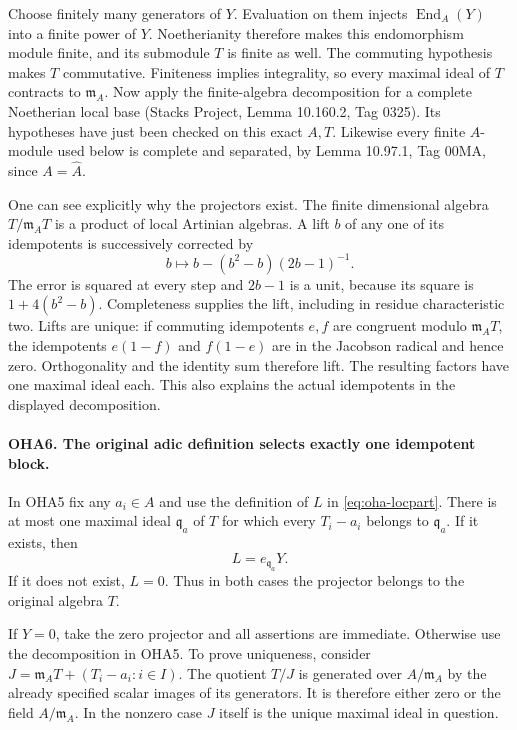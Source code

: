 Choose finitely many generators of \(Y\). Evaluation on them
injects \(\operatorname{End}_A(Y)\) into a finite power of \(Y\).
Noetherianity therefore makes this endomorphism module finite,
and its submodule \(T\) is finite as well. The commuting hypothesis
makes \(T\) commutative. Finiteness implies integrality, so every
maximal ideal of \(T\) contracts to \(\mathfrak m_A\).
Now apply the finite-algebra decomposition for a complete
Noetherian local base (Stacks Project, Lemma 10.160.2, Tag 0325).
Its hypotheses have just been checked on this exact \(A,T\).
Likewise every finite \(A\)-module used below is complete and
separated, by Lemma 10.97.1, Tag 00MA, since \(A=\widehat A\).

One can see explicitly why the projectors exist. The finite
dimensional algebra \(T/\mathfrak m_AT\) is a product of local
Artinian algebras. A lift \(b\) of any one of its idempotents
is successively corrected by
\[
                 b\longmapsto b-(b^2-b)(2b-1)^{-1}.
\]
The error is squared at every step and \(2b-1\) is a unit,
because its square is \(1+4(b^2-b)\). Completeness supplies
the lift, including in residue characteristic two. Lifts are
unique: if commuting idempotents \(e,f\) are congruent modulo
\(\mathfrak m_AT\), the idempotents \(e(1-f)\) and \(f(1-e)\)
are in the Jacobson radical and hence zero. Orthogonality and
the identity sum therefore lift. The resulting factors have
one maximal ideal each. This also explains the actual
idempotents in the displayed decomposition.

\paragraph{OHA6. The original adic definition selects exactly one idempotent block.}
\label{claim:OHA6}
In OHA5 fix any \(a_i\in A\) and use the definition of \(L\)
in \eqref{eq:oha-locpart}. There is at most one maximal ideal
\(\mathfrak q_a\) of \(T\) for which every \(T_i-a_i\) belongs
to \(\mathfrak q_a\). If it exists, then
\[
                            L=e_{\mathfrak q_a}Y .
                            \tag{OHA.1}
\]
If it does not exist, \(L=0\). Thus in both cases the projector
belongs to the original algebra \(T\).

If \(Y=0\), take the zero projector and all assertions are immediate.
Otherwise use the decomposition in OHA5. To prove uniqueness, consider
\(J=\mathfrak m_AT+(T_i-a_i:i\in I)\).
The quotient \(T/J\) is generated over \(A/\mathfrak m_A\)
by the already specified scalar images of its generators.
It is therefore either zero or the field \(A/\mathfrak m_A\).
In the nonzero case \(J\) itself is the unique maximal ideal
in question.

